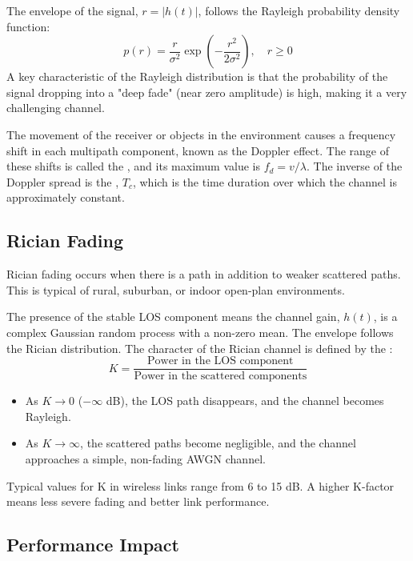 The envelope of the signal, $r = |h(t)|$, follows the Rayleigh probability density function:
\begin{equation}
    p(r) = \frac{r}{\sigma^2} \exp\left(-\frac{r^2}{2\sigma^2}\right), \quad r \geq 0
\end{equation}
A key characteristic of the Rayleigh distribution is that the probability of the signal dropping into a "deep fade" (near zero amplitude) is high, making it a very challenging channel.

The movement of the receiver or objects in the environment causes a frequency shift in each multipath component, known as the Doppler effect. The range of these shifts is called the , and its maximum value is $f_d = v/\lambda$. The inverse of the Doppler spread is the , $T_c$, which is the time duration over which the channel is approximately constant.


\subsection{Rician Fading}

Rician fading occurs when there is a  path in addition to weaker scattered paths. This is typical of rural, suburban, or indoor open-plan environments.

The presence of the stable LOS component means the channel gain, $h(t)$, is a complex Gaussian random process with a non-zero mean. The envelope follows the Rician distribution. The character of the Rician channel is defined by the :
\begin{equation}
    K = \frac{\text{Power in the LOS component}}{\text{Power in the scattered components}}
\end{equation}
\begin{itemize}
    \item As $K \to 0$ ($-\infty$ dB), the LOS path disappears, and the channel becomes Rayleigh.
    \item As $K \to \infty$, the scattered paths become negligible, and the channel approaches a simple, non-fading AWGN channel.
\end{itemize}
Typical values for K in wireless links range from 6 to 15 dB. A higher K-factor means less severe fading and better link performance.


\subsection{Performance Impact}

